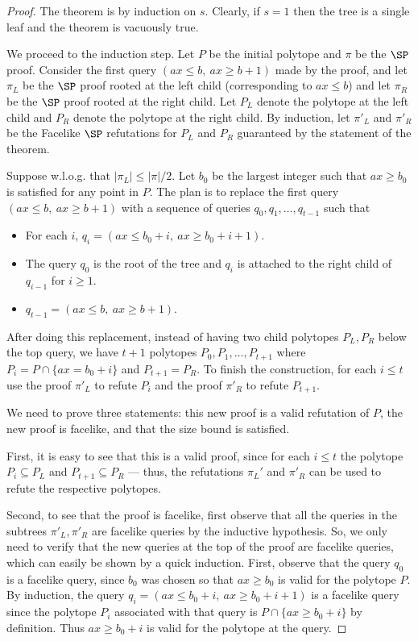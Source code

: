 \documentclass[11pt]{article}
\begin{document}
\begin{proof}
	The theorem is by induction on $s$. Clearly, if $s=1$ then the tree is a single leaf and the theorem is vacuously true.
	
	We proceed to the induction step. Let $P$ be the initial polytope and $\pi$ be the $\SP$ proof. Consider the first query $(ax \leq b, ~ax \geq b+1)$ made by the proof, and let $\pi_L$ be the $\SP$ proof rooted at the left child (corresponding to $ax \leq b$) and let $\pi_R$ be the $\SP$ proof rooted at the right child. Let $P_L$ denote the polytope at the left child and $P_R$ denote the polytope at the right child. By induction, let $\pi'_L$ and $\pi'_R$ be the Facelike $\SP$ refutations for $P_L$ and $P_R$ guaranteed by the statement of the theorem.
	
	Suppose w.l.o.g. that $|\pi_L| \leq |\pi|/2$. Let $b_0$ be the largest integer such that $ax \geq b_0$ is satisfied for any point in $P$. The plan is to replace the first query $(ax \leq b, ~ax \geq b+1)$ with a sequence of queries $q_0, q_1, \ldots, q_{t-1}$ such that
	\begin{itemize}
		\item For each $i$, $q_i =(ax \leq b_0+i,~ax \geq b_0+i+1)$.
		\item The query $q_0$ is the root of the tree and $q_i$ is attached to the right child of $q_{i-1}$ for $i \geq 1$.
		\item $q_{t-1} = (ax \leq b,~ax \geq b+1)$.
	\end{itemize}
	After doing this replacement, instead of having two child polytopes $P_L, P_R$ below the top query, we have $t+1$ polytopes $P_0,P_1,\ldots,P_{t+1}$ where $P_i = P \cap \{ax =b_0 +i\}$ and $P_{t+1} = P_R$. To finish the construction, for each $i \leq t$ use the proof $\pi'_L$ to refute $P_i$ and the proof $\pi'_R$ to refute $P_{t+1}$. 
	
	We need to prove three statements: this new proof is a valid refutation of $P$, the new proof is facelike, and that the size bound is satisfied. 
	
	First, it is easy to see that this is a valid proof, since for each $i \leq t$ the polytope $P_i \subseteq P_L$ and $P_{t+1} \subseteq P_R$ --- thus, the refutations $\pi_L'$ and $\pi'_R$ can be used to refute the respective polytopes. 
	
	Second, to see that the proof is facelike, first observe that all the queries in the subtrees $\pi'_L, \pi'_R$ are facelike queries by the inductive hypothesis. 
	So, we only need to verify that the new queries at the top of the proof are facelike queries, which can easily be shown by a quick induction. First, observe that the query $q_0$ is a facelike query, since $b_0$ was chosen so that $ax \geq b_0$ is valid for the polytope $P$. 
	By induction, the query $q_i = (ax \leq b_0 + i, ~ax \geq b_0 + i+1)$ is a facelike query since the polytope $P_i$ associated with that query is $P \cap \{ax \geq b_0 + i\}$ by definition. Thus $ax \geq b_0 + i$ is valid for the polytope at the query.
	

\end{proof}
\end{document}
